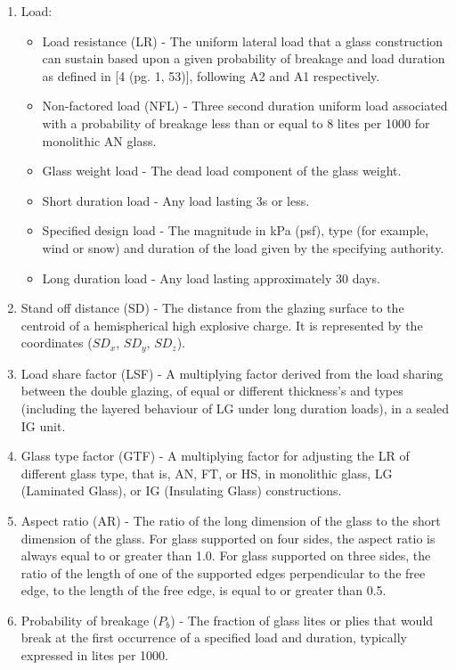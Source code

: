 \documentclass[12pt]{article}
\begin{document}
\begin{enumerate}
\begin{itemize}
\end{itemize}
\item{Load:}
\begin{itemize}
\item{Load resistance (LR) - The uniform lateral load that a glass construction can sustain based upon a given probability of breakage and load duration as defined in [4 (pg. 1, 53)], following A2 and A1 respectively.}
\item{Non-factored load (NFL) - Three second duration uniform load associated with a probability of breakage less than or equal to 8 lites per 1000 for monolithic AN glass.}
\item{Glass weight load - The dead load component of the glass weight.}
\item{Short duration load - Any load lasting 3s or less.}
\item{Specified design load - The magnitude in kPa (psf), type (for example, wind or snow) and duration of the load given by the specifying authority.}
\item{Long duration load - Any load lasting approximately 30 days.}
\end{itemize}
\item{Stand off distance (SD) - The distance from the glazing surface to the centroid of a hemispherical high explosive charge. It is represented by the coordinates (${SD_{x}}$, ${SD_{y}}$, ${SD_{z}}$).}
\item{Load share factor (LSF) - A multiplying factor derived from the load sharing between the double glazing, of equal or different thickness's and types (including the layered behaviour of LG under long duration loads), in a sealed IG unit.}
\item{Glass type factor (GTF) - A multiplying factor for adjusting the LR of different glass type, that is, AN, FT, or HS, in monolithic glass, LG (Laminated Glass), or IG (Insulating Glass) constructions.}
\item{Aspect ratio (AR) - The ratio of the long dimension of the glass to the short dimension of the glass. For glass supported on four sides, the aspect ratio is always equal to or greater than 1.0. For glass supported on three sides, the ratio of the length of one of the supported edges perpendicular to the free edge, to the length of the free edge, is equal to or greater than 0.5.}
\item{Probability of breakage (${P_{b}}$) - The fraction of glass lites or plies that would break at the first occurrence of a specified load and duration, typically expressed in lites per 1000.}
\end{enumerate}
\end{document}
